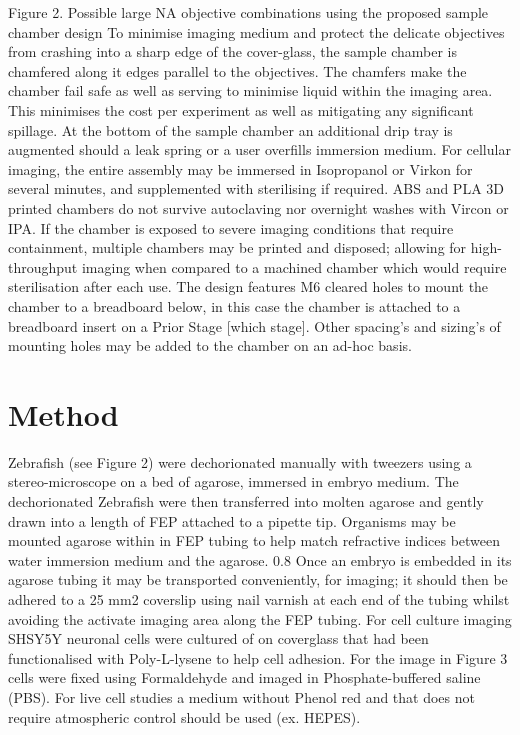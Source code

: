 Figure 2.
Possible large NA objective combinations using the proposed sample chamber design
To minimise imaging medium and protect the delicate objectives from crashing into a sharp edge of the cover-glass, the sample chamber is chamfered along it edges parallel to the objectives.
The chamfers make the chamber fail safe as well as serving to minimise liquid within the imaging area.
This minimises the cost per experiment as well as mitigating any significant spillage.
At the bottom of the sample chamber an additional drip tray is augmented should a leak spring or a user overfills immersion medium.
For cellular imaging, the entire assembly may be immersed in Isopropanol or Virkon for several minutes, and supplemented with sterilising if required.
ABS and PLA 3D printed chambers do not survive autoclaving nor overnight washes with Vircon or IPA.
If the chamber is exposed to severe imaging conditions that require containment, multiple chambers may be printed and disposed; allowing for high-throughput imaging when compared to a machined chamber which would require sterilisation after each use.
The design features M6 cleared holes to mount the chamber to a breadboard below, in this case the chamber is attached to a breadboard insert on a Prior Stage [which stage].
Other spacing’s and sizing’s of mounting holes may be added to the chamber on an ad-hoc basis.
\section{Method}
Zebrafish (see Figure 2) were dechorionated manually with tweezers using a stereo-microscope on a bed of agarose, immersed in embryo medium.
The dechorionated Zebrafish were then transferred into molten agarose and gently drawn into a length of FEP attached to a pipette tip.
Organisms may be mounted agarose within in FEP tubing to help match refractive indices between water immersion medium and the agarose.
0.8%
Once an embryo is embedded in its agarose tubing it may be transported conveniently, for imaging; it should then be adhered to a 25 mm2 coverslip using nail varnish at each end of the tubing whilst avoiding the activate imaging area along the FEP tubing.
For cell culture imaging SHSY5Y neuronal cells were cultured of on coverglass that had been functionalised with Poly-L-lysene to help cell adhesion.
For the image in Figure 3 cells were fixed using Formaldehyde and imaged in Phosphate-buffered saline (PBS).
For live cell studies a medium without Phenol red and that does not require atmospheric control should be used (ex.
HEPES).

